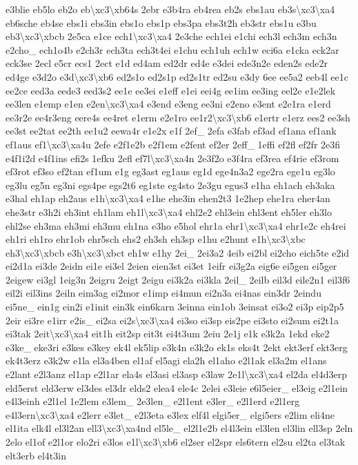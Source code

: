 \begin{DoxyCompactItemize}
e3blie eb5lo eb2o eb\textbackslash{}xc3\textbackslash{}xb64s 2ebr e3b4ra eb4rea eb2s ebs1au eb3s\textbackslash{}xc3\textbackslash{}xa4 eb6sche eb4se ebs1i ebs3in ebs1o ebs1p ebs3pa ebs3t2h eb3str ebs1u e3bu eb3\textbackslash{}xc3\textbackslash{}xbcb 2e5ca e1ce ech1\textbackslash{}xc3\textbackslash{}xa4 2e3che ech1ei e1chi ech3l ech3m ech3n e2cho\-\_\- ech1o4b e2ch3r ech3ta ech3t4ei e1chu ech1uh ech1w eci6a e1cka eck2ar eck3se 2ecl e5cr ecs1 2ect e1d ed4am ed2dr ed4e e3dei ede3n2e eden2s ede2r ed4ge e3d2o e3d\textbackslash{}xc3\textbackslash{}xb6 ed2s1o ed2s1p ed2s1tr ed2su e3dy 6ee ee5a2 eeb4l ee1c ee2ce eed3a eede3 eed3s2 ee1e ee3ei e1eff e1ei eei4g ee1im ee3ing eel2e e1e2lek ee3len e1emp e1en e2en\textbackslash{}xc3\textbackslash{}xa4 e3end e3eng ee3ni e2eno e3ent e2e1ra e1erd ee3r2e ee4r3eng eere4s ee4ret e1erm e2e1ro ee1r2\textbackslash{}xc3\textbackslash{}xb6 e1ertr e1erz ees2 ee3sh ee3st ee2tat ee2th ee1u2 eewa4r e1e2x e1f 2ef\-\_\- 2efa e3fab ef3ad ef1ana ef1ank ef1aus ef1\textbackslash{}xc3\textbackslash{}xa4u 2efe e2f1e2b e2f1em e2fent ef2er 2eff\-\_\- 1effi ef2fl ef2fr 2e3fi e4f1i2d e4f1ins efi2s 1efku 2efl ef7l\textbackslash{}xc3\textbackslash{}xa4n 2e3f2o e3f4ra ef3rea ef4rie ef3rom ef3rot ef3so ef2tan ef1um e1g eg3ast eg1aus eg1d ege4n3a2 ege2ra ege1u eg3lo eg3lu eg5n eg3ni egs4pe egs2t6 eg1ste eg4sto 2e3gu egus3 e1ha eh1ach eh3aka e3hal eh1ap eh2aus e1h\textbackslash{}xc3\textbackslash{}xa4 e1he ehe3in ehen2t3 1e2hep ehe1ra eher4an ehe3str e3h2i eh3int eh1lam eh1l\textbackslash{}xc3\textbackslash{}xa4 ehl2e2 ehl3ein ehl3ent eh5ler eh3lo ehl2se eh3ma eh3mi eh3mu eh1na e3ho e5hol ehr1a ehr1\textbackslash{}xc3\textbackslash{}xa4 ehr1e2c eh4rei eh1ri eh1ro ehr1ob ehr5sch ehs2 eh3sh eh3sp e1hu e2hunt e1h\textbackslash{}xc3\textbackslash{}xbc eh3\textbackslash{}xc3\textbackslash{}xbcb e3h\textbackslash{}xc3\textbackslash{}xbct eh1w e1hy 2ei\-\_\- 2ei3a2 4eib ei2bl ei2cho eich5te e2id ei2d1a ei3de 2eidn ei1e ei3el 2eien eien3st ei3et 1eifr ei3g2a eig6e ei5gen ei5ger 2eigew ei3gl 1eig3n 2eigru 2eigt 2eigu ei3k2a ei3kla 2eil\-\_\- 2eilb eil3d eile2n1 eil3f6 eil2i eil3ins 2eiln eim3ag ei2mor e1imp ei4mun ei2n3a ei4nas ein3dr 2eindu ei5ne\-\_\- ein1g ein2i e1init ein3k ein6karn 3einna ein1ob 3einsat ei3o2 ei3p eip2p5 2eir ei3re e1irr e2is\-\_\- ei2sa ei2s\textbackslash{}xc3\textbackslash{}xa4 ei3so ei3sp eis2pe ei3sto ei2sum ei2t1a ei3tak 2eit\textbackslash{}xc3\textbackslash{}xa4 eit1h eit2sp eit3t ei4t3um 2eiu 2e1j e1k e3k2a 1ekd eke2 e3ke\-\_\- eke3ri e3kes e3key ek4l ek5lip e3k4n e3k2o ek1s eks4t 2ekt ekt3erf ekt3erg ek4t3erz e3k2w e1la el3a4ben el1af el5agi ela2h el1aho e2l1ak el3a2m el1ans e2lant e2l3anz el1ap e2l1ar ela4s el3asi el3asp e3law 2e1l\textbackslash{}xc3\textbackslash{}xa4 el2da el4d3erp eld5erst eld3erw el3des el3dr elds2 elea4 ele4c 2elei e3leie e6l5eier\-\_\- el3eig e2l1ein e4l3einh e2l1el 1e2lem e3lem\-\_\- 2e3len\-\_\- e2l1ent e3ler\-\_\- e2l1erd e2l1erg e4l3ern\textbackslash{}xc3\textbackslash{}xa4 e2lerr e3let\-\_\- e2l3eta e3lex elf4l elgi5er\-\_\- elgi5ers e2lim eli4ne el1ita elk4l el3l2an ell3\textbackslash{}xc3\textbackslash{}xa4nd el5le\-\_\- el2l1e2b el4l3ein el3len el3lin ell3sp 2eln 2elo el1of e2l1or elo2ri e3los e1l\textbackslash{}xc3\textbackslash{}xb6 el2ser el2spr els6tern el2su el2ta el3tak elt3erb el4t3in 
\end{DoxyCompactItemize}
